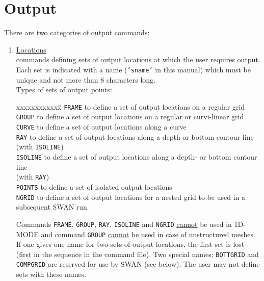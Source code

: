 \documentclass[12pt]{book}
\begin{document}
\section{Output}
There are two categories of output commands:
\begin{enumerate}

\item \underline{Locations}\\
      commands defining sets of output \underline{locations} at which the user requires output. Each set is
      indicated with a name ({\tt {'sname'}} in this manual) which must be unique and not more than 8
      characters long.
      \\[2ex]
      Types of sets of output points:
      \begin{tabbing}
      xxxxxxxxxxxx\= \kill
      {\tt FRAME}   \> to define a set of output locations on a regular grid\\
      {\tt GROUP}   \> to define a set of output locations on a regular or curvi-linear grid\\
      {\tt CURVE}   \> to define a set of output locations along a curve\\
      {\tt RAY}     \> to define a set of output locations along a depth or bottom contour line\+\\
                       (with {\tt ISOLINE})\-\\
      {\tt ISOLINE} \> to define a set of output locations along a depth- or bottom contour line\+\\
                       (with {\tt RAY})\-\\
      {\tt POINTS}  \> to define a set of isolated output locations\\
      {\tt NGRID}   \> to define a set of output locations for a nested grid to be used in a\+\\
                       subsequent SWAN run\-\\
      \end{tabbing}

      Commands {\tt FRAME}, {\tt GROUP}, {\tt RAY}, {\tt ISOLINE} and {\tt NGRID} \underline{cannot} be used in 1D-MODE
      and command {\tt GROUP} \underline{cannot} be used in case of unstructured meshes. If one
      gives one name for two sets of output locations, the first set is lost (first in the sequence in the
      command file). Two special names: {\tt BOTTGRID} and {\tt COMPGRID} are reserved for use by SWAN
      (see below). The user may not define sets with these names.


\end{enumerate}
\end{document}
